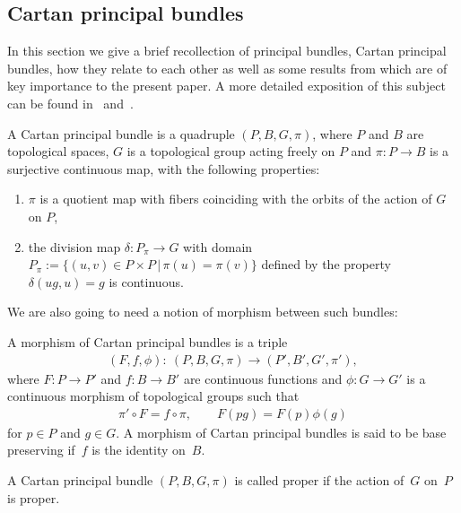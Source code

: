 \subsection{Cartan principal bundles}
In this section we give a brief recollection of principal bundles, Cartan principal bundles, how they relate to each other as well as some results from \cite{P} which are of key importance to the present paper. A more detailed exposition of this subject can be found in~\cite{McK1} and~\cite{P}.
\begin{defi} A Cartan principal bundle is a quadruple $(P,B,G,\pi)$, where $P$ and $B$ are topological spaces, $G$ is a topological group acting freely on $P$ and $\pi\colon P\rightarrow B$ is a surjective continuous map, with the following properties:
\begin{enumerate}\itemsep=0pt
\item[1)] $\pi$ is a quotient map with fibers coinciding with the orbits of the action of $G$ on $P$,
\item[2)] the division map $\delta\colon P_{\pi}\rightarrow G$ with domain $P_{\pi}:=\{(u,v)\in P\times P\, |\, \pi(u)=\pi(v)\}$ defined by the property $\delta(ug,u)=g$ is continuous.
\end{enumerate}
\end{defi}
We are also going to need a notion of morphism between such bundles:
\begin{defi}A morphism of Cartan principal bundles is a triple
\begin{gather*} (F,f,\phi)\colon \ (P,B,G,\pi)\rightarrow (P',B',G',\pi'),\end{gather*} where $F\colon P\rightarrow P'$ and $f\colon B\rightarrow B'$ are continuous functions and $\phi\colon G\rightarrow G'$ is a continuous morphism of topological groups such that
\begin{gather*}
\pi'\circ F=f\circ\pi, \qquad F(pg)=F(p)\phi(g)
\end{gather*}
for $p\in P$ and $g\in G$. A morphism of Cartan principal bundles is said to be base preserving if~$f$ is the identity on~$B$.
\end{defi}
\begin{defi} A Cartan principal bundle $(P,B,G,\pi)$ is called proper if the action of~$G$ on~$P$ is proper.
\end{defi}

